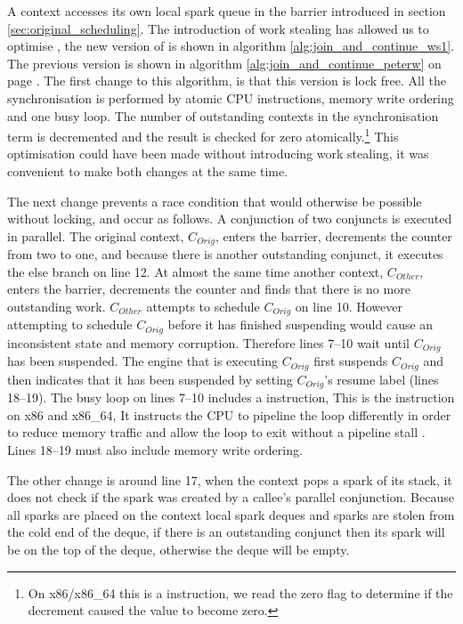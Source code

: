 A context accesses its own local spark queue in the \joinandcontinue barrier
introduced in section \ref{sec:original_scheduling}.
The introduction of work stealing has allowed us to optimise
\joinandcontinue,
the new version of \joinandcontinue is shown in algorithm
\ref{alg:join_and_continue_ws1}.
The previous version is shown in
algorithm \ref{alg:join_and_continue_peterw}
on page \pageref{alg:join_and_continue_peterw}.
The first change to this algorithm,
is that this version is lock free.
All the synchronisation is performed by atomic CPU instructions, memory
write ordering and one busy loop.
The number of outstanding contexts in the synchronisation term is
decremented and the result is checked for zero atomically.\footnote{
    On x86/x86\_64 this is a  instruction, we read the
    zero flag to determine if the decrement caused the value to become
    zero.}
This optimisation could have been made without introducing work stealing,
it was convenient to make both changes at the same time.

The next change prevents a race condition that would otherwise be possible
without locking, and occur as follows.
A conjunction of two conjuncts is executed in parallel.
The original context, $C_{Orig}$,
enters the barrier, decrements the counter from two to one,
and because there is another outstanding conjunct,
it executes the else branch on line 12.
At almost the same time another context, $C_{Other}$,
enters the barrier, decrements the counter and finds that there is no more
outstanding work.
$C_{Other}$ attempts to schedule $C_{Orig}$ on line 10.
However attempting to schedule $C_{Orig}$ before it has finished suspending
would cause an inconsistent state and memory corruption.
Therefore lines 7--10 wait until $C_{Orig}$ has been suspended.
The engine that is executing $C_{Orig}$ first suspends $C_{Orig}$ and then
indicates that it has been suspended by setting $C_{Orig}$'s resume label
(lines 18--19).
The busy loop on lines 7--10 includes a  instruction,
This is the  instruction on x86 and x86\_64,
It instructs the CPU to pipeline the loop differently in order to reduce
memory traffic and allow the loop to exit without a pipeline stall
\citep{intel:pause}.
Lines 18--19 must also include memory write ordering.

The other change is around line 17,
when the context pops a spark of its stack, it does not check if the spark
was created by a callee's parallel conjunction.
Because all sparks are placed on the context local spark deques and
sparks are stolen from the cold end of the deque,
if there is an outstanding conjunct then its spark will be on the top of the
deque,
otherwise the deque will be empty.

